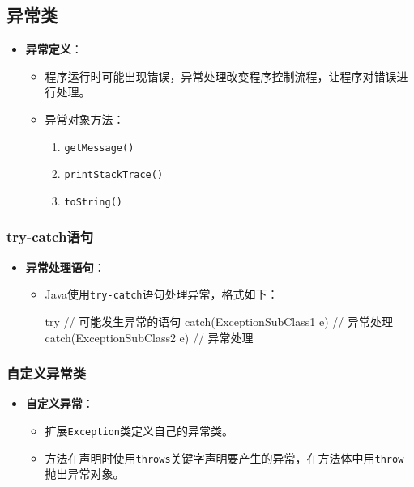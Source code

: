 \documentclass[a4paper, 10pt]{ctexart}
\begin{document}
\subsection{异常类}
\begin{itemize}
  \item \textbf{异常定义}：
  \begin{itemize}
    \item 程序运行时可能出现错误，异常处理改变程序控制流程，让程序对错误进行处理。
    \item 异常对象方法：
    \begin{enumerate}
      \item \texttt{getMessage()}
      \item \texttt{printStackTrace()}
      \item \texttt{toString()}
    \end{enumerate}
  \end{itemize}
\end{itemize}

\subsubsection{try-catch语句}
\begin{itemize}
  \item \textbf{异常处理语句}：
  \begin{itemize}
    \item Java使用\texttt{try-catch}语句处理异常，格式如下：
    \begin{codeblock}
try {
    // 可能发生异常的语句
} catch(ExceptionSubClass1 e) {
    // 异常处理
} catch(ExceptionSubClass2 e) {
    // 异常处理
}
    \end{codeblock}
  \end{itemize}
\end{itemize}

\subsubsection{自定义异常类}
\begin{itemize}
  \item \textbf{自定义异常}：
  \begin{itemize}
    \item 扩展\texttt{Exception}类定义自己的异常类。
    \item 方法在声明时使用\texttt{throws}关键字声明要产生的异常，在方法体中用\texttt{throw}抛出异常对象。
  \end{itemize}
\end{itemize}
\end{document}
